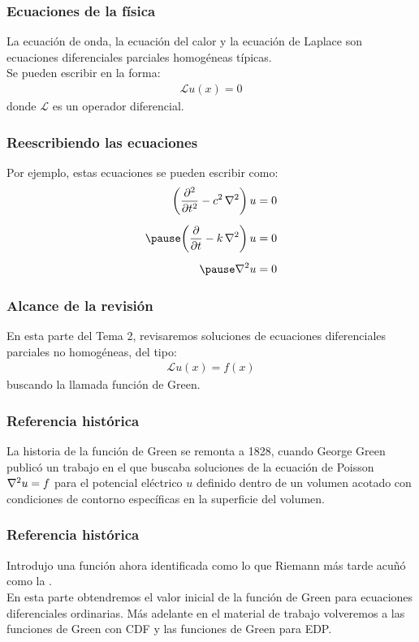 \documentclass[12pt]{beamer}
\begin{document}
\begin{frame}
\frametitle{Ecuaciones de la física}
La ecuación de onda, la ecuación del calor y la ecuación de Laplace son ecuaciones diferenciales parciales homogéneas típicas.
\\
\bigskip
\pause
Se pueden escribir en la forma:
\pause
\begin{align*}
\mathcal{L} u (x) = 0
\end{align*}
donde $\mathcal{L}$ es un operador diferencial.
\end{frame}
\begin{frame}
\frametitle{Reescribiendo las ecuaciones}
Por ejemplo, estas ecuaciones se pueden escribir como:
\pause
\begin{eqnarray*}
\begin{aligned}
\bigg( \pdv[2]{t} - c^{2} \, \laplacian \bigg) \, u &= 0 \\[0.5em] \pause
\bigg( \pdv{t} - k \, \laplacian \bigg) \, u &= 0 \\[0.5em] \pause
\laplacian{u} &= 0
\end{aligned}
\end{eqnarray*}
\end{frame}

\begin{frame}
\frametitle{Alcance de la revisión}
En esta parte del Tema  2, revisaremos soluciones de ecuaciones diferenciales parciales no homogéneas, del tipo:
\pause
\begin{align*}
\mathcal{L} u (x) = f (x)
\end{align*}
buscando la llamada función de Green. 
\end{frame}

\begin{frame}
\frametitle{Referencia histórica}
La historia de la función de Green se remonta a 1828, cuando George Green publicó un trabajo en el que buscaba soluciones de la ecuación de Poisson $\laplacian{u} = f$ para el potencial eléctrico $u$ definido dentro de un volumen acotado con condiciones de contorno específicas en la superficie del volumen.
\end{frame}

\begin{frame}
\frametitle{Referencia histórica}
Introdujo una función ahora identificada como lo que Riemann más tarde acuñó como la .
\\
\bigskip
\pause
En esta parte obtendremos el valor inicial de la función de Green para ecuaciones diferenciales ordinarias.  \pause Más adelante en el material de trabajo volveremos a las funciones de Green con CDF y las funciones de Green para EDP.
\end{frame}
\end{document}
